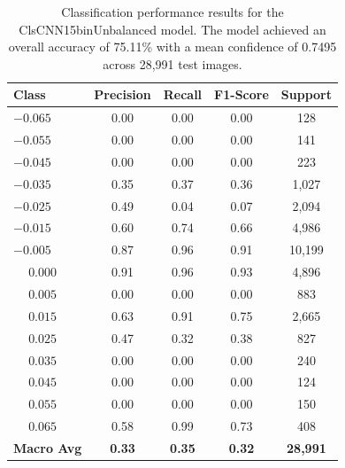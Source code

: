 \begin{table}[htbp]
\centering
\begin{tabular}{@{}lcccc@{}}
\toprule
\textbf{Class} & \textbf{Precision} & \textbf{Recall} & \textbf{F1-Score} & \textbf{Support} \\
\midrule
$-0.065$ & 0.00 & 0.00 & 0.00 & 128 \\
$-0.055$ & 0.00 & 0.00 & 0.00 & 141 \\
$-0.045$ & 0.00 & 0.00 & 0.00 & 223 \\
$-0.035$ & 0.35 & 0.37 & 0.36 & 1,027 \\
$-0.025$ & 0.49 & 0.04 & 0.07 & 2,094 \\
$-0.015$ & 0.60 & 0.74 & 0.66 & 4,986 \\
$-0.005$ & 0.87 & 0.96 & 0.91 & 10,199 \\
$\phantom{-}0.000$ & 0.91 & 0.96 & 0.93 & 4,896 \\
$\phantom{-}0.005$ & 0.00 & 0.00 & 0.00 & 883 \\
$\phantom{-}0.015$ & 0.63 & 0.91 & 0.75 & 2,665 \\
$\phantom{-}0.025$ & 0.47 & 0.32 & 0.38 & 827 \\
$\phantom{-}0.035$ & 0.00 & 0.00 & 0.00 & 240 \\
$\phantom{-}0.045$ & 0.00 & 0.00 & 0.00 & 124 \\
$\phantom{-}0.055$ & 0.00 & 0.00 & 0.00 & 150 \\
$\phantom{-}0.065$ & 0.58 & 0.99 & 0.73 & 408 \\
\midrule
\textbf{Macro Avg} & \textbf{0.33} & \textbf{0.35} & \textbf{0.32} & \textbf{28,991} \\
\bottomrule
\end{tabular}
\caption{Classification performance results for the ClsCNN15binUnbalanced model. The model achieved an overall accuracy of 75.11\% with a mean confidence of 0.7495 across 28,991 test images.}
\label{tab:clf_report_ClsCNN15binUnbalanced}
\end{table}


